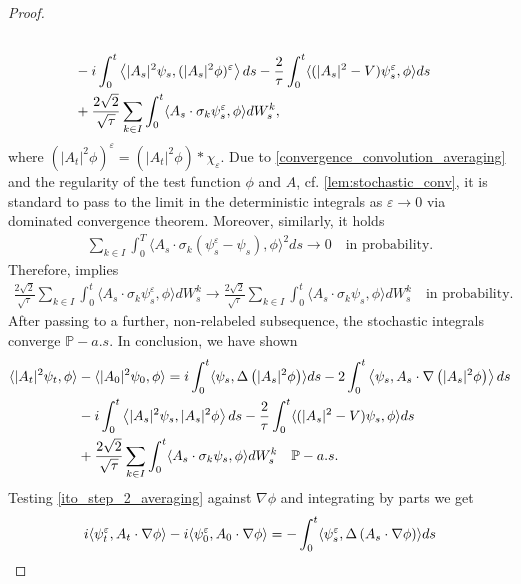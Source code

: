 \documentclass[a4paper,10pt]{amsart}
\renewcommand{\epsilon}{\varepsilon}
\theoremstyle{remark}
\numberwithin{equation}{section}
\begin{document}
\begin{proof}
\begin{align}
     \\& -i\int_0^t\left\langle |A_s|^2\psi_s, (|A_s|^2\phi)^{\epsilon}\right\rangle ds -\frac{2}{\tau}\int_0^t \langle(|A_s|^2-V)\psi^{\epsilon}_s,\phi\rangle ds\notag\\ &+\frac{2\sqrt{2}}{\sqrt{\tau}}\sum_{k\in I }\int_0^t  \langle A_s\cdot \sigma_k\psi^{\epsilon}_s, \phi\rangle dW^k_s,
   \end{align}
   where $(|A_t|^2\phi)^{\epsilon}=(|A_t|^2\phi)\ast \chi_{\epsilon}.$ Due to \eqref{convergence_convolution_averaging} and the regularity of the test function $\phi$ and $A$, cf. \cref{lem:stochastic_conv}, it is standard to pass to the limit in the deterministic integrals as $\epsilon\rightarrow 0$ via dominated convergence theorem. 
   Moreover, similarly, it holds
   \begin{align*}
      \sum_{k\in I }\int_0^T\langle A_s\cdot \sigma_k(\psi^{\epsilon}_s-\psi_s), \phi\rangle^2ds \rightarrow 0\quad\mbox{in probability.}
   \end{align*}
   Therefore, \cite[Lemma 4.3]{bagnara2025no} implies 
   \begin{align*}
       \frac{2\sqrt{2}}{\sqrt{\tau}}\sum_{k\in I }\int_0^t  \langle A_s\cdot \sigma_k\psi^{\epsilon}_s, \phi\rangle dW^k_s\rightarrow \frac{2\sqrt{2}}{\sqrt{\tau}}\sum_{k\in I }\int_0^t  \langle A_s\cdot \sigma_k\psi_s, \phi\rangle dW^k_s \quad\mbox{in probability.}
   \end{align*}
   After passing to a further, non-relabeled subsequence, the stochastic
   integrals converge $\mathbb{P}-a.s.$ In conclusion, we have shown
    \begin{align}\label{ito_step_4_averaging}
      \langle |A_t|^2\psi_t,\phi\rangle&-\langle |A_0|^2\psi_0,\phi\rangle=i\int_0^t\langle\psi_s,\Delta\left(|A_s|^2 \phi\right)\rangle ds -2\int_0^t\left\langle\psi_s, A_s\cdot\nabla\left( |A_s|^2\phi\right)\right\rangle ds \notag
     \\& -i\int_0^t\left\langle |A_s|^2\psi_s, |A_s|^2\phi\right\rangle ds -\frac{2}{\tau}\int_0^t \langle(|A_s|^2-V)\psi_s,\phi\rangle ds\notag\\ &+\frac{2\sqrt{2}}{\sqrt{\tau}}\sum_{k\in I }\int_0^t  \langle A_s\cdot \sigma_k\psi_s, \phi\rangle dW^k_s \quad \mathbb{P}-a.s.
   \end{align}
   Testing \eqref{ito_step_2_averaging} against $\nabla\phi$ and integrating by parts we get
   \begin{align*}
       i\langle   \psi^{\epsilon}_t, A_t\cdot\nabla \phi\rangle&-i\langle   \psi^{\epsilon}_0, A_0\cdot\nabla \phi\rangle=-\int_0^t\langle\psi^{\epsilon}_s,\Delta\left(A_s\cdot\nabla \phi\right)\rangle ds \notag\\ 

\end{align*}
\end{proof}
\end{document}
